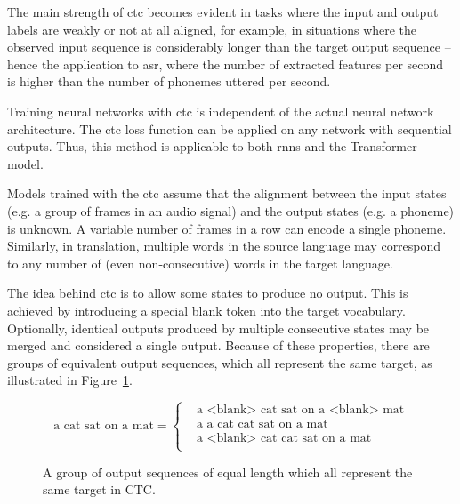 The main strength of \ac{ctc} becomes evident in tasks where the input and
output labels are weakly or not at all aligned, for example, in situations
where the observed input sequence is considerably longer than the target output
sequence -- hence the application to \ac{asr}, where the number of extracted
features per second is higher than the number of phonemes uttered per second.

Training neural networks with \ac{ctc} is independent of the actual neural
network architecture. The \ac{ctc} loss function can be applied on any network
with sequential outputs. Thus, this method is applicable to both \acp{rnn} and
the Transformer model.

Models trained with the \ac{ctc} assume that the alignment between the input
states (e.g. a group of frames in an audio signal) and the output states
(e.g. a phoneme) is unknown. A variable number of frames in a row can encode a
single phoneme. Similarly, in translation, multiple words in the source
language may correspond to any number of (even non-consecutive) words in the
target language.

The idea behind \ac{ctc} is to allow some states to produce no output. This is
achieved by introducing a special blank token into the target vocabulary.
Optionally, identical outputs produced by multiple consecutive states may be
merged and considered a single output. Because of these properties, there are
groups of equivalent output sequences, which all represent the same target, as
illustrated in Figure~\ref{fig:ctc-equivalent-sequences}.

\begin{figure}
  \centering
  \begin{minipage}{\textwidth}
    \begin{equation*}
        \text{a cat sat on a mat} =
        \begin{cases}
          & \text{a <blank> cat sat on a <blank> mat} \\
          & \text{a a cat cat sat on a mat} \\
          & \text{a <blank> cat cat sat on a mat} \\
        \end{cases}
    \end{equation*}
  \end{minipage}
  \caption{A group of output sequences of equal length which all represent the
    same target in CTC.} %
  \label{fig:ctc-equivalent-sequences}
\end{figure}

